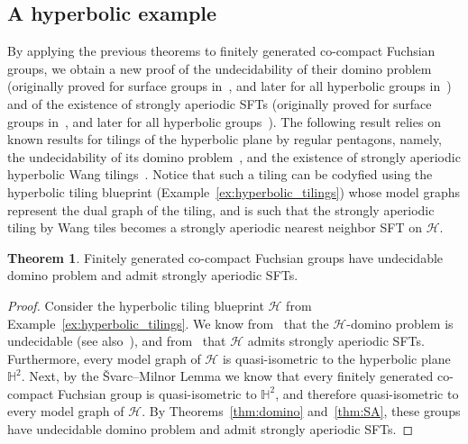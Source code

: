 \documentclass{article}
\theoremstyle{definition}
\newtheorem{theorem}{Theorem}[section] %
\theoremstyle{definition}
\begin{document}
\subsection{A hyperbolic example}

By applying the previous theorems to finitely generated co-compact Fuchsian groups, we obtain a new proof of the undecidability of their domino problem (originally proved for surface groups in~\cite{aubrun2019domino}, and later for all hyperbolic groups in~\cite{bartholdi2023domino}) and of the existence of strongly aperiodic SFTs (originally proved for surface groups in~\cite{cohen2017strongly}, and later for all hyperbolic groups~\cite{cohen2022strongly}). The following result relies on known results for tilings of the hyperbolic plane by regular pentagons, namely, the undecidability of its domino problem~\cite{kari2008undecidability}, and the existence of strongly aperiodic hyperbolic Wang tilings~\cite{kari2016piecewise}. Notice that such a tiling can be codyfied using the hyperbolic tiling blueprint (Example~\ref{ex:hyperbolic_tilings}) whose model graphs represent the dual graph of the tiling, and is such that the strongly aperiodic tiling by Wang tiles becomes a strongly aperiodic nearest neighbor SFT on $\mathcal{H}$.

\begin{theorem}
    Finitely generated co-compact Fuchsian groups have undecidable domino problem and admit strongly aperiodic SFTs.
\end{theorem}

\begin{proof}
    Consider the hyperbolic tiling blueprint $\mathcal{H}$ from Example~\ref{ex:hyperbolic_tilings}. We know from~\cite{kari2008undecidability} that the $\mathcal{H}$-domino problem is undecidable (see also~\cite[Theorem 1]{aubrun2019domino}), and from~\cite{kari2016piecewise} that $\mathcal{H}$ admits strongly aperiodic SFTs. Furthermore, every model graph of $\mathcal{H}$ is quasi-isometric to the hyperbolic plane $\mathbb{H}^2$. Next, by the \v{S}varc–Milnor Lemma we know that every finitely generated co-compact Fuchsian group is quasi-isometric to $\mathbb{H}^2$, and therefore quasi-isometric to every model graph of $\mathcal{H}$. By Theorems~\ref{thm:domino} and~\ref{thm:SA}, these groups have undecidable domino problem and admit strongly aperiodic SFTs.
\end{proof}

\end{document}
